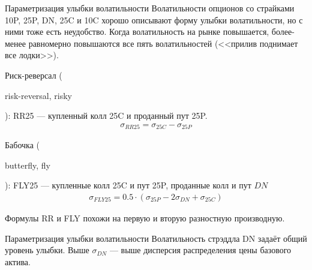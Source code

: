 \documentclass{beamer}
\newcommand{\en}[1]{\begin{otherlanguage}{english}#1\end{otherlanguage}}
\begin{document}
\begin{frame}{Параметризация улыбки волатильности}
\justify
Волатильности опционов со страйками 10P, 25P, DN, 25C и 10C хорошо описывают форму улыбки волатильности, но с ними тоже есть неудобство. Когда волатильность на рынке повышается, более-менее равномерно повышаются все пять волатильностей (<<прилив поднимает все лодки>>).

\justify
Риск-реверсал (\en{risk-reversal, risky}): RR25 --- купленный колл 25C и проданный пут 25P.
\begin{align*}
\sigma_{RR25} = \sigma_{25C} - \sigma_{25P}
\end{align*}

\justify
Бабочка (\en{butterfly, fly}): FLY25 --- купленные колл 25C и пут 25P, проданные колл и пут $DN$
\begin{align*}
\sigma_{FLY25} = 0.5\cdot(\sigma_{25P} - 2\sigma_{DN} + \sigma_{25C})
\end{align*}

\justify
Формулы RR и FLY похожи на первую и вторую разностную производную.
\end{frame}



\begin{frame}{Параметризация улыбки волатильности}
\justify
Волатильность стрэддла DN задаёт общий уровень улыбки. Выше $\sigma_{DN}$ --- выше дисперсия распределения цены базового актива.

\centering
{}
\end{frame}
\end{document}
